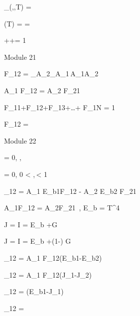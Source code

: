 \documentclass[24pt]{article}
\begin{document}
\varepsilon_\theta(\theta,\phi,T) = 

\varepsilon(T) =  = 

\alpha+\rho+\tau = 1


Module 21

F_{12} =
\int_{A_2}\!\!\int_{A_1}\!\!\,A_1A_2

\therefore A_1 F_{12} = A_2 F_{21}

F_{11}+F_{12}+F_{13}+\ldots + F_{1N} = 1

F_{12} = 


Module 22

\tau = 0,\,\,,\,\,

\tau = 0,\,\,0 < \rho,\,\alpha < 1

_{12} = A_1 E_{b1}F_{12} - A_2 E_{b2} F_{21}

A_1F_{12} = A_2F_{21}\, , \qquad E_b = \sigma T^4

J = \pi I = \varepsilon E_b +\rho G

J = \pi I = \varepsilon E_b +(1-\varepsilon) G

_{12} = A_1 F_{12}(E_{b1}-E_{b2})

_{12} = A_1 F_{12}(J_{1}-J_{2})

_{12} = (E_{b1}-J_1)

_{12} = 
\end{document}
